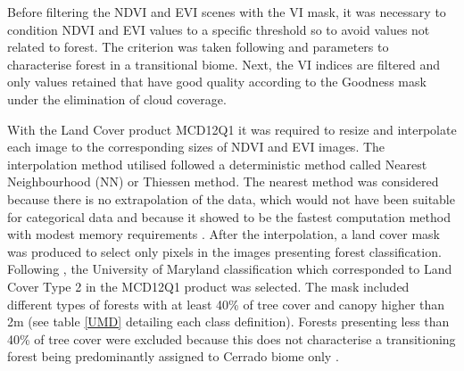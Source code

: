 Before filtering the NDVI and EVI scenes with the VI mask, it was necessary to condition NDVI and EVI values to a specific threshold so to avoid values not related to forest. The criterion was taken following \citet{geerken_2009} and \citet{bayma_sano_2015} parameters to characterise forest in a transitional biome. Next, the VI indices are filtered and only values retained that have good quality according to the Goodness mask under the elimination of cloud coverage. 

With the Land Cover product MCD12Q1 it was required to resize and interpolate each image to the corresponding sizes of NDVI and EVI images. The interpolation method utilised followed a deterministic method called Nearest Neighbourhood (NN) or Thiessen method. The nearest method was considered because there is no extrapolation of the data, which would not have been suitable for categorical data and because it showed to be the fastest computation method with modest memory requirements \citep{ SLUITER_2009, matlab_2017}. After the interpolation, a land cover mask was produced to select only pixels in the images presenting forest classification. Following \citet{sulla2_2018}, the University of Maryland classification which corresponded to Land Cover Type 2 in the MCD12Q1 product was selected. The mask included different types of forests with at least 40\% of tree cover and canopy higher than 2m (see table \ref{UMD} detailing each class definition). Forests presenting less than 40\% of tree cover were excluded because this does not characterise a transitioning forest being predominantly assigned to Cerrado biome only \citep{bayma_sano_2015}.  

